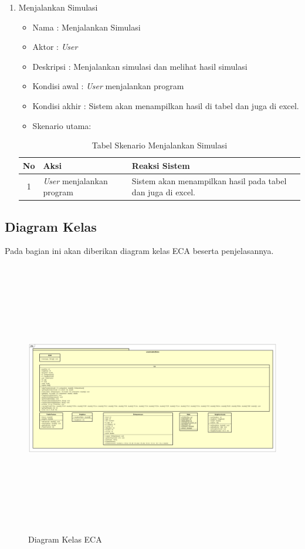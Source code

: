 \begin{enumerate}
	\item Menjalankan Simulasi
		\begin{itemize}
			\item Nama : Menjalankan Simulasi
			\item Aktor : \textit{User}
			\item Deskripsi : Menjalankan simulasi dan melihat hasil simulasi
			\item Kondisi awal : \textit{User} menjalankan program
			\item Kondisi akhir : Sistem akan menampilkan hasil di tabel dan juga di excel.
			\item Skenario utama:
		\end{itemize}
		
\begin{table}[H]
\centering
\caption{Tabel Skenario Menjalankan Simulasi}
\begin{tabular}{|c|p{7cm}|p{7cm}|}
\hline
No & Aksi & Reaksi Sistem\\
\hline
1 & \textit{User} menjalankan program & Sistem akan menampilkan hasil pada tabel dan juga di excel. \\
\hline
\end{tabular}
\label{tabelSkenario3}
\end{table}
		
\end{enumerate}


\subsection{Diagram Kelas}


Pada bagian ini akan diberikan diagram kelas ECA beserta penjelasannya.

	\begin{figure} [H]
		\centering  
		\includegraphics[width=18cm, height=12cm]{diagramKelas0} 
		\caption[Diagram Kelas ECA]{Diagram Kelas ECA} 
		\label{fig:CD1} 
	\end{figure}
	


